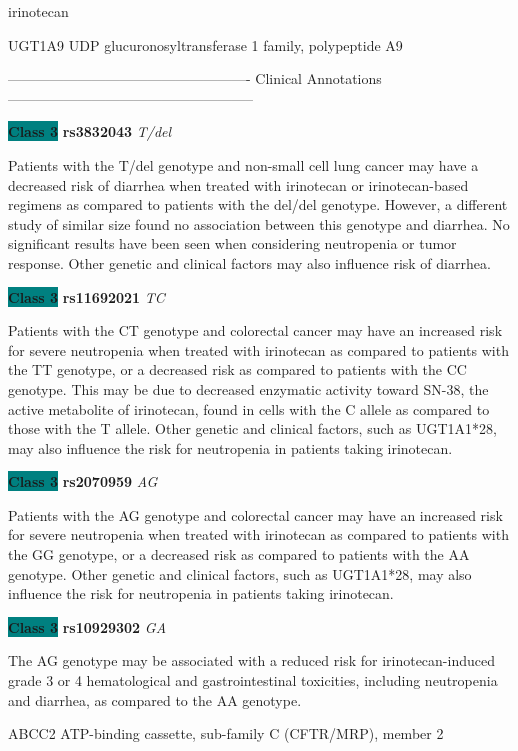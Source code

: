 \documentclass{resume} %
\begin{document}
\begin{rSection}{ irinotecan }
\begin{rSubsection}{ UGT1A9 }{ UDP glucuronosyltransferase 1 family, polypeptide A9 }{}{}
\item[] ---------------------------------------------------- Clinical Annotations -----------------------------------------------------\newline
\item \textbf{\colorbox{teal} {Class 3}} \textbf{ rs3832043 } \textit{ T/del }
\item[] Patients with the T/del genotype and non-small cell lung cancer may have a decreased risk of diarrhea when treated with irinotecan or irinotecan-based regimens as compared to patients with the del/del genotype. However, a different study of similar size found no association between this genotype and diarrhea. No significant results have been seen when considering neutropenia or tumor response. Other genetic and clinical factors may also influence risk of diarrhea.\item \textbf{\colorbox{teal} {Class 3}} \textbf{ rs11692021 } \textit{ TC }
\item[] Patients with the CT genotype and colorectal cancer may have an increased risk for severe neutropenia when treated with irinotecan as compared to patients with the TT genotype, or a decreased risk as compared to patients with the CC genotype. This may be due to decreased enzymatic activity toward SN-38, the active metabolite of irinotecan, found in cells with the C allele as compared to those with the T allele. Other genetic and clinical factors, such as UGT1A1*28, may also influence the risk for neutropenia in patients taking irinotecan.\item \textbf{\colorbox{teal} {Class 3}} \textbf{ rs2070959 } \textit{ AG }
\item[] Patients with the AG genotype and colorectal cancer may have an increased risk for severe neutropenia when treated with irinotecan as compared to patients with the GG genotype, or a decreased risk as compared to patients with the AA genotype. Other genetic and clinical factors, such as UGT1A1*28, may also influence the risk for neutropenia in patients taking irinotecan.\item \textbf{\colorbox{teal} {Class 3}} \textbf{ rs10929302 } \textit{ GA }
\item[] The AG genotype may be associated with a reduced risk for irinotecan-induced grade 3 or 4 hematological and gastrointestinal toxicities, including neutropenia and diarrhea, as compared to the AA genotype. 
\end{rSubsection}\begin{rSubsection}{ ABCC2 }{ ATP-binding cassette, sub-family C (CFTR/MRP), member 2 }{}{}
\item[]


\end{rSubsection}
\end{rSection}
\end{document}
